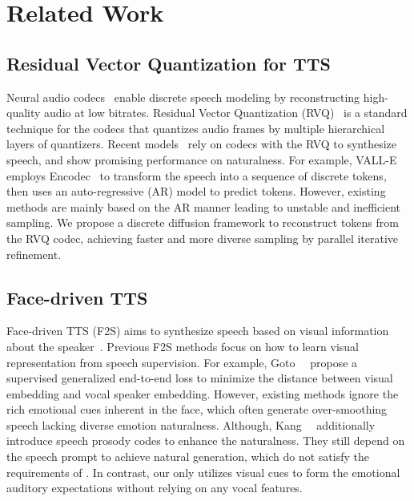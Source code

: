 \section{Related Work}
\label{sec:relatedwork}

\subsection{Residual Vector Quantization for TTS}
Neural audio codecs~\cite{SoundStream:journals/taslp/ZeghidourLOST22, speechtokenizer:conf/iclr/ZhangZLZQ24} enable discrete speech modeling by reconstructing high-quality audio at low bitrates. 
Residual Vector Quantization (RVQ)~\cite{vasuki2006review,Srcodec:conf/icassp/ZhengTXX24} is a standard technique for the codecs that quantizes audio frames by multiple hierarchical layers of quantizers. 
Recent models~\cite{SPEAR-TTS:journals/tacl/KharitonovVBMGP23,nautralspeech2:conf/iclr/ShenJ0LL00Z024} rely on codecs with the RVQ to synthesize speech, and show promising performance on naturalness. 
For example, VALL-E~\cite{valle:journals/corr/abs-2301-02111} employs Encodec~\cite{encodec:journals/tmlr/DefossezCSA23} to transform the speech into a sequence of discrete tokens, then uses an auto-regressive (AR) model to predict tokens. 
However, existing methods are mainly based on the AR manner leading to unstable and inefficient sampling. We propose a discrete diffusion framework \methodname to reconstruct tokens from the RVQ codec, achieving faster and more diverse sampling by parallel iterative refinement. 

\subsection{Face-driven TTS}
Face-driven TTS (F2S) aims to synthesize speech based on visual information about the speaker~\cite{hearingface:conf/asru/PlusterWQW21,hyface:journals/corr/abs-2408-09802,Face2Speech:conf/interspeech/GotoOSTM20,facestylespeech:journals/corr/abs-2311-05844}. Previous F2S methods focus on how to learn visual representation from speech supervision. For example, Goto~\etal~\cite{Face2Speech:conf/interspeech/GotoOSTM20} propose a supervised generalized end-to-end loss to minimize the distance between visual embedding and vocal speaker embedding. 
However, existing methods ignore the rich emotional cues inherent in the face, which often generate over-smoothing speech lacking diverse emotion naturalness. 
Although, Kang~\etal~\cite{facestylespeech:journals/corr/abs-2311-05844} additionally introduce speech prosody codes to enhance the naturalness. They still depend on the speech prompt to achieve natural generation, which do not satisfy the requirements of \taskname. 
In contrast, our \methodname only utilizes visual cues to form the emotional auditory expectations without relying on any vocal features. 

